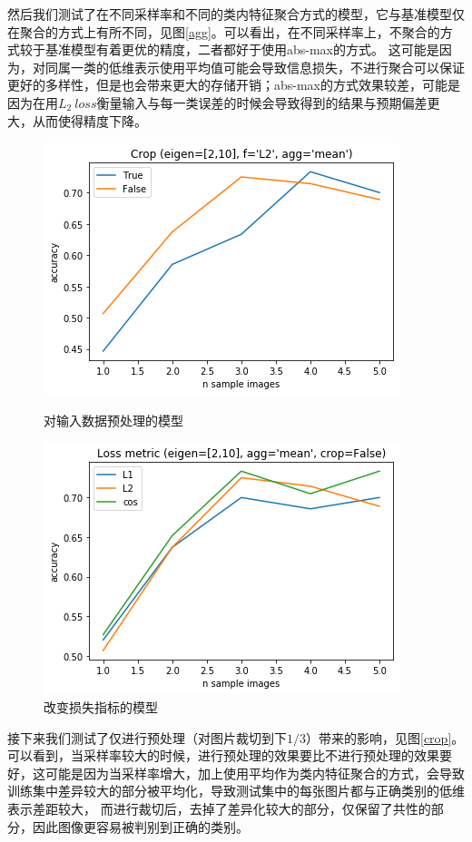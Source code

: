 \documentclass{ctexart}
\begin{document}
然后我们测试了在不同采样率和不同的类内特征聚合方式的模型，它与基准模型仅在聚合的方式上有所不同，见图\ref{agg}。可以看出，在不同采样率上，不聚合的方式较于基准模型有着更优的精度，二者都好于使用abs-max的方式。
这可能是因为，对同属一类的低维表示使用平均值可能会导致信息损失，不进行聚合可以保证更好的多样性，但是也会带来更大的存储开销；abs-max的方式效果较差，可能是因为在用$L_2\ loss$衡量输入与每一类误差的时候会导致得到的结果与预期偏差更大，从而使得精度下降。
\begin{figure}[htbp]
    \begin{minipage}[t]{0.45 \linewidth}
        \centering
        \includegraphics[scale=0.45]{imgs/crop.png}
        \caption{对输入数据预处理的模型}
        \label{crop}
    \end{minipage}
    \begin{minipage}[t]{0.45 \linewidth}
        \centering
        \includegraphics[scale=0.45]{imgs/loss-metric.png}
        \caption{改变损失指标的模型}
        \label{loss}
    \end{minipage}
\end{figure}

接下来我们测试了仅进行预处理（对图片裁切到下$1/3$）带来的影响，见图\ref{crop}。可以看到，当采样率较大的时候，进行预处理的效果要比不进行预处理的效果要好，这可能是因为当采样率增大，加上使用平均作为类内特征聚合的方式，会导致训练集中差异较大的部分被平均化，导致测试集中的每张图片都与正确类别的低维表示差距较大，
而进行裁切后，去掉了差异化较大的部分，仅保留了共性的部分，因此图像更容易被判别到正确的类别。
\end{document}

